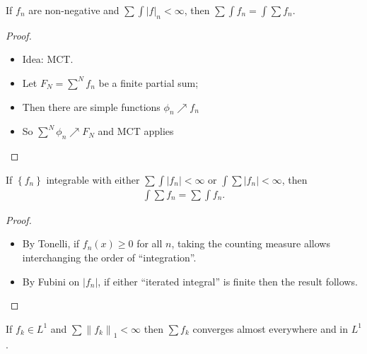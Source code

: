 \begin{proposition}

If \(f_n\) are non-negative and
\(\sum \int {\left\lvert {f} \right\rvert}_n < \infty\), then
\(\sum \int f_n = \int \sum f_n\).

\end{proposition}

\begin{proof}

\begin{itemize}
\tightlist
\item
  Idea: MCT.
\item
  Let \(F_N = \sum^N f_n\) be a finite partial sum;
\item
  Then there are simple functions \(\phi_n \nearrow f_n\)
\item
  So \(\sum^N \phi_n \nearrow F_N\) and MCT applies
\end{itemize}

\end{proof}

\begin{theorem}

If \(\left\{{f_n}\right\}\) integrable with either
\(\sum \int {\left\lvert {f_n} \right\rvert} < \infty\) or
\(\int\sum {\left\lvert {f_n} \right\rvert} < \infty\), then
\begin{align*}  
\int\sum f_n = \sum \int f_n
.\end{align*}

\end{theorem}

\begin{proof}

\envlist

\begin{itemize}
\tightlist
\item
  By Tonelli, if \(f_n(x) \geq 0\) for all \(n\), taking the counting
  measure allows interchanging the order of ``integration''.
\item
  By Fubini on \({\left\lvert {f_n} \right\rvert}\), if either
  ``iterated integral'' is finite then the result follows.
\end{itemize}

\end{proof}

\begin{proposition}[?]

If \(f_k \in L^1\) and
\(\sum {\left\lVert {f_k} \right\rVert}_1 < \infty\) then \(\sum f_k\)
converges almost everywhere and in \(L^1\).

\end{proposition}

